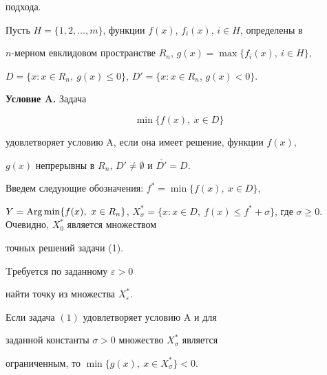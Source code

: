 подхода.





Пусть $H=\{1,2,\dotsc,m\}$, функции $f(x)$, $f_i(x)$, $i\in H$, определены в 


$n$-мерном евклидовом пространстве $R_n$, $g(x)=\max\{f_i(x),\ i\in H\}$, 


$D=\{x: x\in R_n,\  g(x)\le 0\}$, $D'=\{x: x\in R_n$, $g(x)<0\}$.


\medskip





{\bf Условие A.} Задача


\begin{equation}


\min\{f(x),\ x\in D\}


\end{equation}


удовлетворяет условию A, если она имеет решение, функции $f(x)$,


$g(x)$ непрерывны в $R_n$, $D'\ne\emptyset$ и $\overline{D'}=D$. 


\medskip





Введем следующие обозначения: $f^*=\min\{f(x),\ x\in D\}$,


$Y=\Arg\min\{f(x),\ x\in R_n\}$, $X_{\sigma}^*=\{x: x\in D,\ f(x)\le


f^*+\sigma\}$, где $\sigma\ge 0$. Очевидно, $X_0^*$ является множеством


точных решений задачи (1). 





Tребуется по заданному $\varepsilon>0$ 


найти точку из множества $X_{\varepsilon}^*$.





\begin{lem}


Если задача $(1)$ удовлетворяет условию $\mathrm A$ и для


заданной константы $\sigma>0$ множество $X_{\sigma}^*$ является


ограниченным, то $\min\{g(x),\ x\in X_{\sigma}^*\}<0$.


\end{lem}





